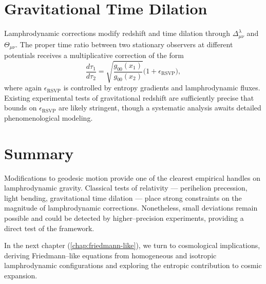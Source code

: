 \section{Gravitational Time Dilation}

Lamphrodynamic corrections modify redshift and time dilation through
$\Delta^\lambda_{\mu\nu}$ and $\Theta_{\mu\nu}$. The proper time ratio
between two stationary observers at different potentials receives a
multiplicative correction of the form
\[
  \frac{d\tau_1}{d\tau_2}
  = \sqrt{\frac{g_{00}(x_1)}{g_{00}(x_2)}}
  \bigl(1 + \epsilon_{\mathrm{RSVP}}\bigr),
\]
where again $\epsilon_{\mathrm{RSVP}}$ is controlled by entropy gradients
and lamphrodynamic fluxes. Existing experimental tests of gravitational
redshift are sufficiently precise that bounds on $\epsilon_{\mathrm{RSVP}}$
are likely stringent, though a systematic analysis awaits detailed
phenomenological modeling.

\section{Summary}

Modifications to geodesic motion provide one of the clearest empirical
handles on lamphrodynamic gravity. Classical tests of relativity --- 
perihelion precession, light bending, gravitational time dilation ---
place strong constraints on the magnitude of lamphrodynamic corrections.
Nonetheless, small deviations remain possible and could be detected by
higher--precision experiments, providing a direct test of the \rsvpabbr{}
framework.

In the next chapter (\cref{chap:friedmann-like}), we turn to cosmological
implications, deriving Friedmann--like equations from homogeneous and
isotropic lamphrodynamic configurations and exploring the entropic
contribution to cosmic expansion.

\clearpage

